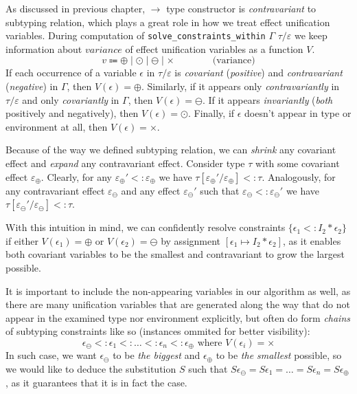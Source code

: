 \documentclass[declaration,shortabstract]{iithesis}
\theoremstyle{definition} \newtheorem{definition}{Definition}[section]
\begin{document}
As discussed in previous chapter, $\rightarrow$ type constructor is \textit{contravariant} to subtyping relation, which plays a great role in how we treat effect unification variables.
During computation of \texttt{solve\_constraints\_within} $\Gamma$ $\tau/\varepsilon$ we keep information about $variance$ of effect unification variables as a function $V$.
$$
    v \Coloneqq \oplus \mid \odot \mid \ominus \mid \times \qquad\qquad \text{(variance)}
$$
If each occurrence of a variable $\epsilon$ in $\tau/\varepsilon$
is \textit{covariant} (\textit{positive}) and \textit{contravariant} (\textit{negative}) in $\Gamma$, then $V(\epsilon) = \oplus$.
Similarly, if it appears only \textit{contravariantly} in $\tau/\varepsilon$
and only \textit{covariantly} in $\Gamma$, then $V(\epsilon) = \ominus$.
If it appears \textit{invariantly} (\textit{both} positively and negatively), then $V(\epsilon) = \odot$. Finally, if $\epsilon$ doesn't appear in type or environment at all, then $V(\epsilon) = \times$.

Because of the way we defined subtyping relation, we can \textit{shrink} any covariant effect and \textit{expand} any contravariant effect.
Consider type $\tau$ with some covariant effect $\varepsilon_\oplus$.
Clearly, for any $\varepsilon_\oplus' <: \varepsilon_\oplus$ we have
$ \tau[\varepsilon_\oplus' / \varepsilon_\oplus] <: \tau $.
Analogously, for any contravariant effect $\varepsilon_\ominus$ and 
any effect $\varepsilon_\ominus'$ such that $\varepsilon_\ominus <: \varepsilon_\ominus'$
we have
$ \tau[\varepsilon_\ominus' / \varepsilon_\ominus] <: \tau$.

With this intuition in mind, we can confidently resolve constraints
$\{\epsilon_1 <: I_2 * \epsilon_2\}$ if either $V(\epsilon_1) = \oplus$ or $V(\epsilon_2)=\ominus$
by assignment $[\epsilon_1 \mapsto I_2 * \epsilon_2]$, as it enables both
covariant variables to be the smallest and contravariant to grow the largest possible.

It is important to include the non-appearing variables in our algorithm as well,
as there are many unification variables that are generated along the way
that do not appear in the examined type nor environment explicitly,
but often do form \textit{chains} of subtyping constraints like so
(instances ommited for better visibility):
$$\epsilon_\ominus <: \epsilon_1 <: \dots <: \epsilon_n <: \epsilon_\oplus \text{ where } V(\epsilon_i) = \times$$
In such case, we want $\epsilon_\ominus$ to be \textit{the biggest} and $\epsilon_\oplus$ to be \textit{the smallest} possible, so we would like to deduce the substitution $S$ such that
$S\epsilon_\ominus = S\epsilon_1 = \dots = S\epsilon_n = S\epsilon_\oplus$,
as it guarantees that it is in fact the case.
\end{document}

